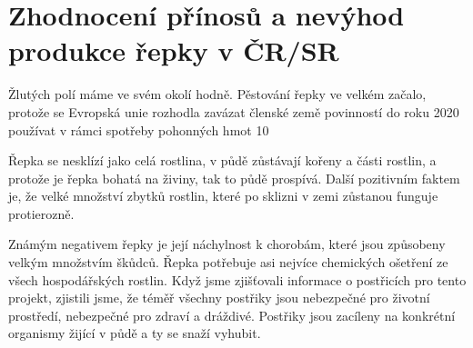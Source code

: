 \documentclass[11pt,a4paper,titlepage]{article}
\begin{document}
\section{Zhodnocení přínosů a nevýhod produkce řepky v ČR/SR}
Žlutých polí máme ve svém okolí hodně. Pěstování řepky ve velkém začalo, protože se Evropská unie rozhodla zavázat členské země povinností do roku 2020 používat v rámci spotřeby pohonných hmot 10 %

Řepka se nesklízí jako celá rostlina, v půdě zůstávají kořeny a části rostlin, a protože je řepka bohatá na živiny, tak to půdě prospívá. Další pozitivním faktem je, že velké množství zbytků rostlin, které po sklizni v zemi zůstanou funguje protierozně.

Známým negativem řepky je její náchylnost k chorobám, které jsou způsobeny velkým množstvím škůdců. Řepka potřebuje asi nejvíce chemických ošetření ze všech hospodářských rostlin. Když jsme zjišťovali informace o postřicích pro tento projekt, zjistili jsme, že téměř všechny postřiky jsou nebezpečné pro životní prostředí, nebezpečné pro zdraví a dráždivé. Postřiky jsou zacíleny na konkrétní organismy žijící v půdě a ty se snaží vyhubit.

\newpage

\end{document}
